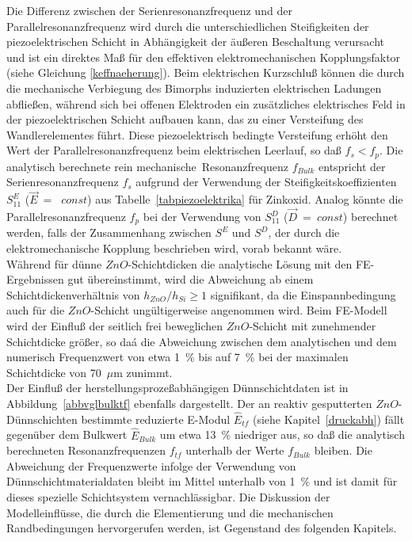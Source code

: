 Die Differenz zwischen der Serienresonanzfrequenz und der
Parallelresonanzfrequenz wird durch die unterschiedlichen Steifigkeiten
der piezoelektrischen Schicht in Abhängigkeit der äußeren Beschaltung
verursacht und ist ein direktes Maß für den effektiven elektromechanischen
Kopplungsfaktor (siehe Gleichung \ref{keffnaeherung}). Beim elektrischen
Kurzschluß können die durch die mechanische Verbiegung des Bimorphs
induzierten elektrischen Ladungen ab\-fließen, während sich bei offenen
Elektroden ein zusätzliches
elektrisches Feld in der piezoelektrischen Schicht aufbauen kann, das zu
einer Versteifung des Wandlerelementes führt. Diese piezoelektrisch
bedingte Versteifung erhöht den Wert der Parallelresonanzfrequenz beim
elektrischen Leerlauf, so daß $f_{s} < f_{p}$.
Die analytisch berechnete \glqq rein mechanische\grqq \, Resonanzfrequenz
$f_{Bulk}$ entspricht der Serienresonanzfrequenz $f_{s}$ aufgrund der
Verwendung der Steifigkeitskoeffizienten $S_{11}^{E}$ ($\vec E$~=~ $const$)
aus Tabelle~\ref{tabpiezoelektrika} für Zinkoxid. Analog könnte die
Parallelresonanzfrequenz $f_{p}$ bei der Verwendung von $S_{11}^{D}$
($\vec D$~=~$const$) berechnet werden, falls der Zusammenhang zwischen
$S^{E}$ und $S^{D}$, der durch die elektromechanische Kopplung
beschrieben wird, vorab bekannt wäre.\\
Während für dünne $ZnO$-Schichtdicken die analytische Lösung mit den
FE-Ergebnissen gut übereinstimmt, wird die Abweichung ab einem
Schichtdickenverhältnis von $h_{ZnO}/h_{Si} \ge 1$ signifikant, da die
Einspannbedingung auch für die $ZnO$-Schicht ungültigerweise angenommen wird.
Beim FE-Modell wird der Einfluß der seitlich frei beweglichen $ZnO$-Schicht
mit zunehmender Schichtdicke größer, so daá die Abweichung zwischen dem
analytischen und dem
numerisch Frequenzwert von etwa 1~\% bis auf 7~\% bei der maximalen
Schichtdicke von 70~$\mu$m zunimmt. \\
%
Der Einfluß der herstellungsprozeßabhängigen Dünnschichtdaten ist
in Abbildung~\ref{abbvglbulktf} ebenfalls dargestellt. Der an reaktiv
gesputterten $ZnO$-Dünnschichten \cite{Wag94} bestimmte reduzierte E-Modul
$\hat E_{tf}$ (siehe Kapitel~\ref{druckabh}) fällt gegenüber dem
Bulkwert $\hat E_{Bulk}$ um etwa 13~\% niedriger aus, so daß die
analytisch berechneten Resonanzfrequenzen $f_{tf}$ unterhalb der
Werte $f_{Bulk}$ bleiben. Die Abweichung der Frequenzwerte infolge
der Verwendung von Dünnschichtmaterialdaten bleibt im Mittel unterhalb
von 1~\% und ist damit für dieses spezielle Schichtsystem vernachlässigbar.
Die Diskussion der Modelleinflüsse, die durch die Elementierung und die
mechanischen Randbedingungen hervorgerufen werden,
ist Gegenstand des folgenden Kapitels.\\



